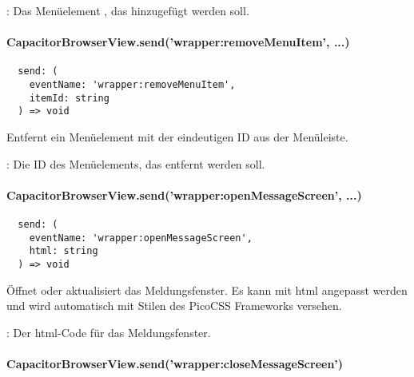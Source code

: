 \begin{arguments}
  \item {}: Das Menüelement , das hinzugefügt werden soll.
\end{arguments}


\paragraph{CapacitorBrowserView.send('wrapper:removeMenuItem', ...)}

\begin{verbatim}
  send: (
    eventName: 'wrapper:removeMenuItem',
    itemId: string
  ) => void
\end{verbatim}

Entfernt ein Menüelement mit der eindeutigen ID  aus der Menüleiste.

\begin{arguments}
  \item {}: Die ID des Menüelements, das entfernt werden soll.
\end{arguments}


\paragraph{CapacitorBrowserView.send('wrapper:openMessageScreen', ...)}

\begin{verbatim}
  send: (
    eventName: 'wrapper:openMessageScreen',
    html: string
  ) => void
\end{verbatim}

Öffnet oder aktualisiert das Meldungsfenster.
Es kann mit \ac{html} angepasst werden und wird automatisch mit Stilen des PicoCSS Frameworks versehen.

\begin{arguments}
  \item {}: Der \ac{html}-Code für das Meldungsfenster.
\end{arguments}


\newpage

\paragraph{CapacitorBrowserView.send('wrapper:closeMessageScreen')}

